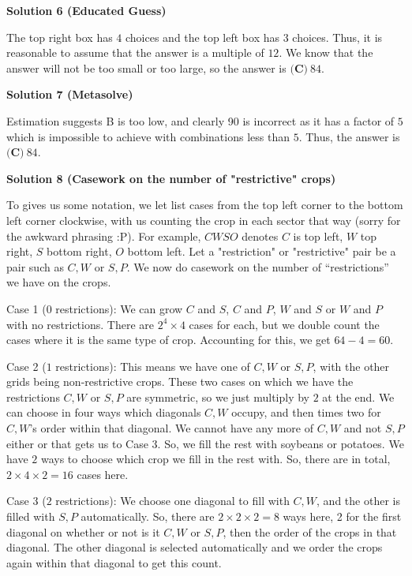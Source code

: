 \begin{enumerate}
 



\textbf{Solution 6 (Educated Guess)}

The top right box has $4$ choices and the top left box has $3$ choices. Thus, it is reasonable to assume that the answer is a multiple of $12$. We know that the answer will not be too small or too large, so the answer is $\boxed{\textbf{(C)}\ 84}$.

 



\textbf{Solution 7 (Metasolve)}

Estimation suggests B is too low, and clearly 90 is incorrect as it has a factor of $5$ which is impossible to achieve with combinations less than $5$. Thus, the answer is $\boxed{\textbf{(C)}\ 84}.$




\textbf{Solution 8 (Casework on the number of "restrictive" crops)}

To gives us some notation, we let list cases from the top left corner to the bottom left corner clockwise, with us counting the crop in each sector that way (sorry for the awkward phrasing :P). For example, $CWSO$ denotes $C$ is top left, $W$ top right, $S$ bottom right, $O$ bottom left. Let a "restriction" or "restrictive" pair be a pair such as $C, W$ or $S, P$. We now do casework on the number of “restrictions” we have on the crops.

 Case 1 ($0$ restrictions): We can grow $C$ and $S$, $C$ and $P$, $W$ and $S$ or $W$ and $P$ with no restrictions. There are $2^4\times4$ cases for each, but we double count the cases where it is the same type of crop. Accounting for this, we get $64-4=60$.

 Case 2 ($1$ restrictions): This means we have one of $C, W$ or $S, P$, with the other grids being non-restrictive crops. These two cases on which we have the restrictions $C, W$ or $S, P$ are symmetric, so we just multiply by $2$ at the end. We can choose in four ways which diagonals $C, W$ occupy, and then times two for $C, W$'s order within that diagonal. We cannot have any more of $C, W$ and not $S, P$ either or that gets us to Case $3$. So, we fill the rest with soybeans or potatoes. We have $2$ ways to choose which crop we fill in the rest with. So, there are in total, $2\times 4\times 2=16$ cases here.

 Case 3 ($2$ restrictions): We choose one diagonal to fill with $C, W$, and the other is filled with $S, P$ automatically. So, there are $2\times 2\times 2=8$ ways here, 2 for the first diagonal on whether or not is it $C, W$ or $S, P$, then the order of the crops in that diagonal. The other diagonal is selected automatically and we order the crops again within that diagonal to get this count.


\end{enumerate}
